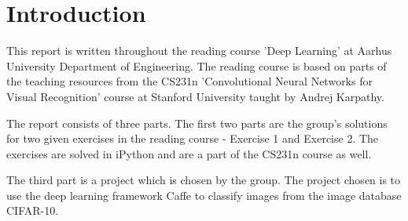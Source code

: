 \graphicspath{{Chapters/Introduction/}}

\chapter{Introduction}

This report is written throughout the reading course 'Deep Learning' at Aarhus
University Department of Engineering. The reading course is based on parts of
the teaching resources from the CS231n 'Convolutional Neural Networks for Visual
Recognition' course at Stanford University taught by Andrej
Karpathy\cite{cs231n}.

The report consists of three parts. The first two parts are the group's solutions for two given exercises in the reading course - Exercise 1 and Exercise 2. The exercises are solved in iPython and are a part of the CS231n course as well.

The third part is a project which is chosen by the group. The project chosen is to use the deep learning framework Caffe to classify images from the image database CIFAR-10.